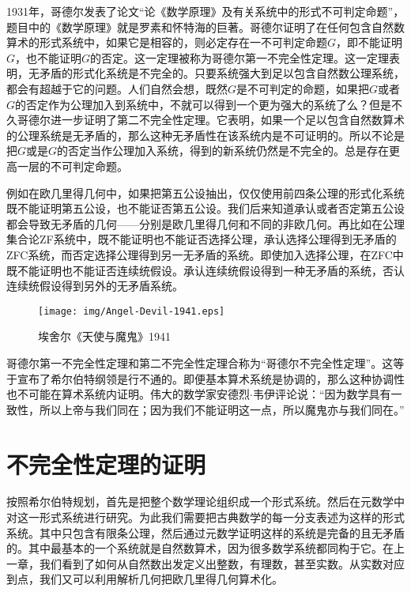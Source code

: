 \documentclass{article}
\begin{document}
1931年，哥德尔发表了论文“论《数学原理》及有关系统中的形式不可判定命题”，题目中的《数学原理》就是罗素和怀特海的巨著。哥德尔证明了在任何包含自然数算术的形式系统中，如果它是相容的，则必定存在一不可判定命题$G$，即不能证明$G$，也不能证明$G$的否定。这一定理被称为哥德尔第一不完全性定理。这一定理表明，无矛盾的形式化系统是不完全的。只要系统强大到足以包含自然数公理系统，都会有超越于它的问题。人们自然会想，既然$G$是不可判定的命题，如果把$G$或者$G$的否定作为公理加入到系统中，不就可以得到一个更为强大的系统了么？但是不久哥德尔进一步证明了第二不完全性定理。它表明，如果一个足以包含自然数算术的公理系统是无矛盾的，那么这种无矛盾性在该系统内是不可证明的。所以不论是把$G$或是$G$的否定当作公理加入系统，得到的新系统仍然是不完全的。总是存在更高一层的不可判定命题。

例如在欧几里得几何中，如果把第五公设抽出，仅仅使用前四条公理的形式化系统既不能证明第五公设，也不能证否第五公设。我们后来知道承认或者否定第五公设都会导致无矛盾的几何——分别是欧几里得几何和不同的非欧几何。再比如在公理集合论ZF系统中，既不能证明也不能证否选择公理，承认选择公理得到无矛盾的ZFC系统，而否定选择公理得到另一无矛盾的系统。即使加入选择公理，在ZFC中既不能证明也不能证否连续统假设。承认连续统假设得到一种无矛盾的系统，否认连续统假设得到另外的无矛盾系统。

\begin{figure}[htbp]
 \centering
 \texttt{[image: img/Angel-Devil-1941.eps]}
 \caption{埃舍尔《天使与魔鬼》1941}
 \label{fig:Angel-Devil-1941}
\end{figure}

哥德尔第一不完全性定理和第二不完全性定理合称为“哥德尔不完全性定理”。这等于宣布了希尔伯特纲领是行不通的。即便基本算术系统是协调的，那么这种协调性也不可能在算术系统内证明。伟大的数学家安德烈$\cdot$韦伊评论说：“因为数学具有一致性，所以上帝与我们同在；因为我们不能证明这一点，所以魔鬼亦与我们同在。”\cite{HanXueTao16}

\section{不完全性定理的证明}

按照希尔伯特规划，首先是把整个数学理论组织成一个形式系统。然后在元数学中对这一形式系统进行研究。为此我们需要把古典数学的每一分支表述为这样的形式系统。其中只包含有限条公理，然后通过元数学证明这样的系统是完备的且无矛盾的。其中最基本的一个系统就是自然数算术，因为很多数学系统都同构于它。在上一章，我们看到了如何从自然数出发定义出整数，有理数，甚至实数。从实数对应到点，我们又可以利用解析几何把欧几里得几何算术化。
\end{document}
